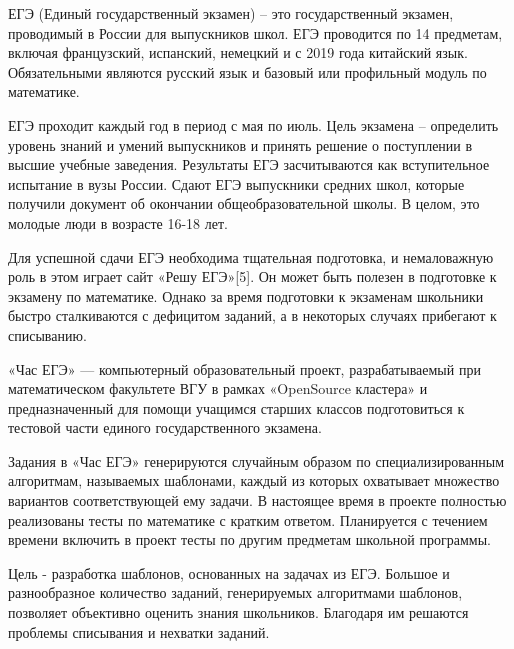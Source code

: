 ЕГЭ (Единый государственный экзамен) – это государственный экзамен, проводимый в России для выпускников школ. ЕГЭ проводится по 14 предметам, включая французский, испанский, немецкий и с 2019 года китайский язык. Обязательными являются русский язык и базовый или профильный модуль по математике.

ЕГЭ проходит каждый год в период с мая по июль. Цель экзамена – определить уровень знаний и умений выпускников и принять решение о поступлении в высшие учебные заведения. Результаты ЕГЭ засчитываются как вступительное испытание в вузы России. Сдают ЕГЭ выпускники средних школ, которые получили документ об окончании общеобразовательной школы. В целом, это молодые люди в возрасте 16-18 лет.

Для успешной сдачи ЕГЭ необходима тщательная подготовка, и немаловажную роль в этом играет сайт «Решу ЕГЭ»[5]. Он может быть полезен в подготовке к экзамену по математике. Однако за время подготовки к экзаменам школьники быстро сталкиваются с дефицитом заданий, а в некоторых случаях прибегают к списыванию.

«Час ЕГЭ» — компьютерный образовательный проект, разрабатываемый при математическом факультете ВГУ в рамках «OpenSource кластера» и предназначенный для помощи учащимся старших классов подготовиться к тестовой части единого государственного экзамена.

Задания в «Час ЕГЭ» генерируются случайным образом по специализированным алгоритмам, называемых шаблонами, каждый из которых охватывает множество вариантов соответствующей ему задачи. В настоящее время в проекте полностью реализованы тесты по математике с кратким ответом. Планируется с течением времени включить в проект тесты по другим предметам школьной программы. 

Цель - разработка шаблонов, основанных на задачах из ЕГЭ. Большое и разнообразное количество заданий, генерируемых алгоритмами шаблонов, позволяет объективно оценить знания школьников. Благодаря им решаются проблемы списывания и нехватки заданий.
